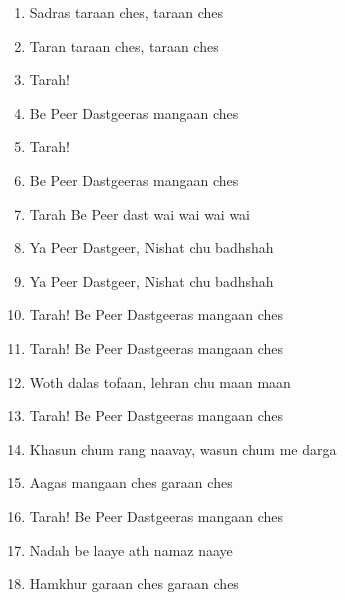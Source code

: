 \documentclass[12pt]{article}
\newcommand{\bigroman}[1]{\fontsize{16pt}{18pt}\selectfont\RaggedRight #1}
\begin{document}
\begin{multicols}{2}
\begin{enumerate}[leftmargin=*, label=\arabic*., font=\fontsize{16pt}{18pt}\selectfont]
  \item \bigroman{Sadras taraan ches, taraan ches} 
  \item \bigroman{Taran taraan ches, taraan ches} 
  \item \bigroman{Tarah!} 
  \item \bigroman{Be Peer Dastgeeras mangaan ches} 
  \item \bigroman{Tarah!} 
  \item \bigroman{Be Peer Dastgeeras mangaan ches} 
  \item \bigroman{Tarah Be Peer dast wai wai wai wai} 
  \item \bigroman{Ya Peer Dastgeer, Nishat chu badhshah} 
  \item \bigroman{Ya Peer Dastgeer, Nishat chu badhshah} 
  \item \bigroman{Tarah! Be Peer Dastgeeras mangaan ches} 
  \item \bigroman{Tarah! Be Peer Dastgeeras mangaan ches} 
  \item \bigroman{Woth dalas tofaan, lehran chu maan maan} 
  \item \bigroman{Tarah! Be Peer Dastgeeras mangaan ches} 
  \item \bigroman{Khasun chum rang naavay, wasun chum me darga} 
  \item \bigroman{Aagas mangaan ches garaan ches} 
  \item \bigroman{Tarah! Be Peer Dastgeeras mangaan ches} 
  \item \bigroman{Nadah be laaye ath namaz naaye} 
  \item \bigroman{Hamkhur garaan ches garaan ches} 
\end{enumerate}

\columnbreak


\end{multicols}
\end{document}
